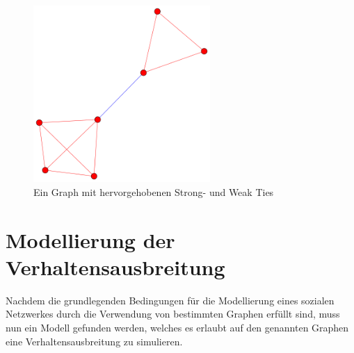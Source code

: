 \documentclass[12pt]{article}
\begin{document}
\begin{figure}
  \begin{center}
    \includegraphics[width=0.60\textwidth]{pic_tieGraph.png}
  \end{center}
  \caption{Ein Graph mit hervorgehobenen Strong- und Weak Ties}
  \label{pic_ties}
\end{figure}

 

\section{Modellierung der Verhaltensausbreitung}
Nachdem die grundlegenden Bedingungen für die Modellierung eines sozialen Netzwerkes durch die Verwendung von bestimmten Graphen erfüllt sind, muss nun ein Modell gefunden werden, welches es erlaubt auf den genannten Graphen eine Verhaltensausbreitung zu simulieren.
\end{document}
